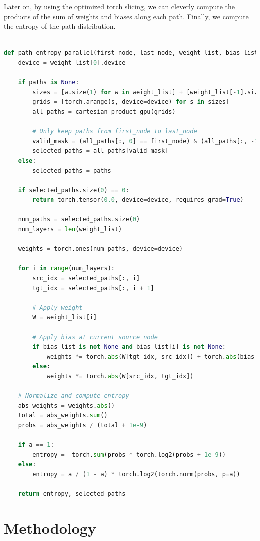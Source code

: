\documentclass[12pt]{article}
\begin{document}
Later on, by using the optimized torch slicing, we can cleverly compute the products of the sum of weights and biases along each path. Finally, we compute the entropy of the path distribution.


\begin{lstlisting}[language=Python,caption={Path Entropic Loss Function}]

def path_entropy_parallel(first_node, last_node, weight_list, bias_list=None, a=1, paths = None):
    device = weight_list[0].device

    if paths is None:
        sizes = [w.size(1) for w in weight_list] + [weight_list[-1].size(0)]
        grids = [torch.arange(s, device=device) for s in sizes]
        all_paths = cartesian_product_gpu(grids)

        # Only keep paths from first_node to last_node
        valid_mask = (all_paths[:, 0] == first_node) & (all_paths[:, -1] == last_node)
        selected_paths = all_paths[valid_mask]
    else:
        selected_paths = paths

    if selected_paths.size(0) == 0:
        return torch.tensor(0.0, device=device, requires_grad=True)

    num_paths = selected_paths.size(0)
    num_layers = len(weight_list)

    weights = torch.ones(num_paths, device=device)

    for i in range(num_layers):
        src_idx = selected_paths[:, i]
        tgt_idx = selected_paths[:, i + 1]

        # Apply weight
        W = weight_list[i]

        # Apply bias at current source node
        if bias_list is not None and bias_list[i] is not None:
            weights *= torch.abs(W[tgt_idx, src_idx]) + torch.abs(bias_list[i][tgt_idx])
        else:
            weights *= torch.abs(W[src_idx, tgt_idx])

    # Normalize and compute entropy
    abs_weights = weights.abs()
    total = abs_weights.sum()
    probs = abs_weights / (total + 1e-9)

    if a == 1:
        entropy = -torch.sum(probs * torch.log2(probs + 1e-9))
    else:
        entropy = a / (1 - a) * torch.log2(torch.norm(probs, p=a))

    return entropy, selected_paths

\end{lstlisting}


\section{Methodology}
\end{document}
